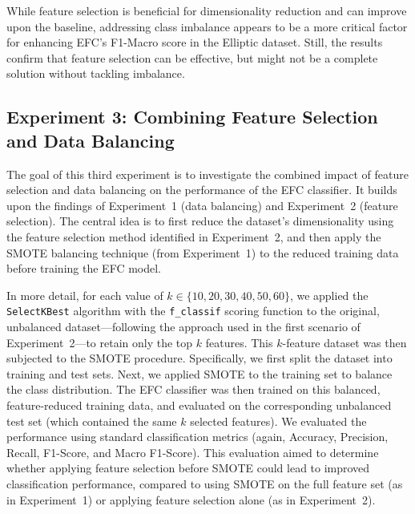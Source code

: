 \documentclass[12pt]{article}
\begin{document}
\begin{highlightbox}
While feature selection is beneficial for dimensionality reduction and can improve upon the baseline,
addressing class imbalance appears to be a more critical factor for enhancing EFC's F1-Macro score in the Elliptic dataset.
Still, the results confirm that feature selection can be effective, but might not be a complete solution without tackling imbalance.
\end{highlightbox}

\subsection{Experiment 3: Combining Feature Selection and Data Balancing} \label{subsec:experiment_3}

The goal of this third experiment is to investigate the combined impact of feature selection and data balancing on the
performance of the EFC classifier. It builds upon the findings of Experiment~1 (data balancing) and Experiment~2
(feature selection). The central idea is to first reduce the dataset's dimensionality using the feature selection method
identified in Experiment~2, and then apply the SMOTE balancing technique (from Experiment~1) to the reduced training data
before training the EFC model.

In more detail, for each value of $k \in \{10, 20, 30, 40, 50, 60\}$, we applied the \texttt{SelectKBest} algorithm with
the \texttt{f\_classif} scoring function to the original, unbalanced dataset---following the approach used in the first
scenario of Experiment~2---to retain only the top $k$ features. This $k$-feature dataset was then subjected to the SMOTE
procedure. Specifically, we first split the dataset into training and test sets. Next, we applied SMOTE to the training
set to balance the class distribution. The EFC classifier was then trained on this balanced, feature-reduced training data,
and evaluated on the corresponding unbalanced test set (which contained the same $k$ selected features).
We evaluated the performance using standard classification metrics (again, Accuracy, Precision, Recall, F1-Score, and Macro
F1-Score). This evaluation aimed to determine whether applying feature selection before SMOTE could lead to improved
classification performance, compared to using SMOTE on the full feature set (as in Experiment~1) or applying feature
selection alone (as in Experiment~2).
\end{document}
